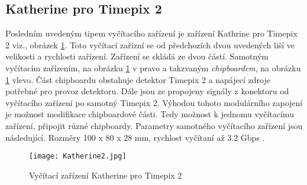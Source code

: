 \subsection{Katherine pro Timepix 2}
Posledním uvedeným tipem vyčítacího zařízení je zařízení Kathrine pro Timepix 2 viz., obrázek \ref{fig:Katherine2}. Toto vyčítací zařízní se od předchozích dvou uvedených liší ve velikosti a rychlosti zařízení. Zařízení se skládá ze dvou částí. Samotným vyčítacím zařízením, na obrázku \ref{fig:Katherine2} v pravo a takzvaným \textit{chipboardem}, na obrázku \ref{fig:Katherine2} vlevo. Část chipboardu obstahuje detektor Timepix 2 a napájecí zdroje potřebné pro provoz detektoru. Dále jsou ze propojeny signály z konektoru od vyčítacího zařízení po samotný Timepix 2. Výhodou tohoto modulárního zapojení je možnost modifikace chipboardové části. Tedy možnost k jednomu vyčítacímu zařízení, připojit různé chipboardy. Parametry samotného vyčítacího zařízení jsou následující. Rozměry 100 x 80 x 28 mm, rychlost vyčítaní až 3.2 Gbps \cite{Burian_2020}.
\begin{figure}[h!]
	\centering
	\captionsetup{justification=centering}
	\texttt{[image: Katherine2.jpg]}
	\caption{Vyčítací zařízení Katherine pro Timepix 2 \cite{Burian_2020}} 
	\label{fig:Katherine2}
\end{figure}	


